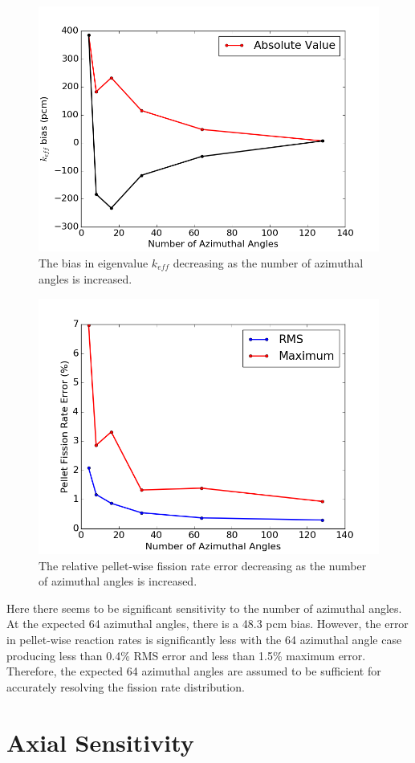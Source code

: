 \begin{figure}[h!]
	\centering
	\includegraphics[width=0.7\linewidth]{figures/results/sensitivity/az_angles_pcm.png}
	\caption[]{The bias in eigenvalue $k_{\textit{eff}}$ decreasing as the number of azimuthal angles is increased.}
	\label{fig:az-angles-pcm}
\end{figure}
\begin{figure}[h!]
	\centering
	\includegraphics[width=0.7\linewidth]{figures/results/sensitivity/az_angles_fr.png}
	\caption[]{The relative pellet-wise fission rate error decreasing as the number of azimuthal angles is increased.}
	\label{fig:az-angles-fr}
\end{figure}

Here there seems to be significant sensitivity to the number of azimuthal angles. At the expected 64 azimuthal angles, there is a 48.3 pcm bias. However, the error in pellet-wise reaction rates is significantly less with the 64 azimuthal angle case producing less than 0.4\% RMS error and less than 1.5\% maximum error. Therefore, the expected 64 azimuthal angles are assumed to be sufficient for accurately resolving the fission rate distribution. 


\section{Axial Sensitivity}
\label{sec:axial-sensitivity}

